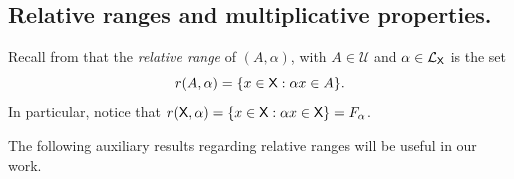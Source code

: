 \documentclass[a4paper,12pt]{amsart}
\newtheorem{lemma}[equation]{Lemma}
\theoremstyle{definition}
\theoremstyle{remark}
\numberwithin{equation}{section}
\newcommand{\osf}{{\normalfont \textsf{X}}}
\newcommand{\lang}{\CL_{\osf}}
\newcommand{\udalgshift}{\TCD_R(\osf)}
\newcommand{\F}{\mathbb{F}}
\newcommand{\CD}{\mathcal{D}}
\newcommand{\CL}{\mathcal{L}}
\newcommand{\TCB}{\mathcal{U}}
\newcommand{\TCD}{\widetilde{\CD}}
\newcommand{\eword}{\omega}
\begin{document}

\subsection{Relative ranges and multiplicative properties.}

Recall from \cite{BGGV} that the \emph{relative range} of $(A,\alpha)$, with $A\in \TCB$ and $\alpha \in \lang$ is the set $$r(A,\alpha)=\{x\in \osf:\alpha x\in A\}.$$ In particular, notice that $r(\osf,\alpha)=\{x\in \osf:\alpha x\in \osf\}=F_{\alpha}$. 

The following auxiliary results regarding relative ranges will be useful in our work.
\end{document}
